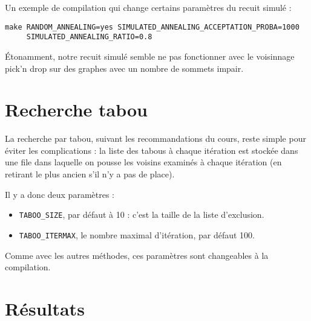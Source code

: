 \documentclass[12pt, a4paper]{article}
\begin{document}
Un exemple de compilation qui change certains paramètres du recuit simulé :
\begin{verbatim}
make RANDOM_ANNEALING=yes SIMULATED_ANNEALING_ACCEPTATION_PROBA=1000
     SIMULATED_ANNEALING_RATIO=0.8
\end{verbatim}

\'Etonamment, notre recuit simulé semble ne pas fonctionner avec le voisinnage pick'n drop sur des graphes avec un nombre de sommets impair.

\section{Recherche tabou}
La recherche par tabou, suivant les recommandations du cours, reste
simple pour éviter les complications : la liste des tabous à chaque itération est stockée 
dans une file dans laquelle on pousse les voisins examinés 
à chaque itération (en retirant le plus ancien s'il n'y a pas de place).

Il y a donc deux paramètres :
\begin{itemize}
\item \texttt{TABOO\_{}SIZE}, par défaut à 10 : c'est la taille de la liste d'exclusion.
\item \texttt{TABOO\_{}ITERMAX}, le nombre maximal d'itération, par défaut 100.
\end{itemize}
Comme avec les autres méthodes, ces paramètres sont changeables à la compilation.

\section{Résultats}
\end{document}
